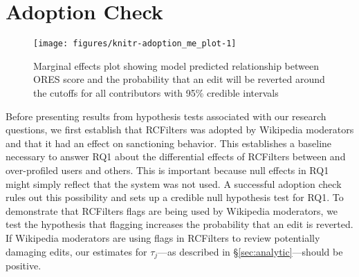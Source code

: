 \documentclass[format=acmsmall, natbib=true,  screen=true]{acmart}
\newenvironment{knitrout}{}{} %
\begin{document}
\section{Adoption Check}
\label{sec:adoption}

\begin{figure}[t]
  \centering
\begin{knitrout}
\color{fgcolor}
\texttt{[image: figures/knitr-adoption\_me\_plot-1]} 

\end{knitrout}
\caption{Marginal effects plot showing model predicted relationship between ORES score and the probability that an edit will be reverted around the cutoffs for all contributors with 95\% credible intervals}
\label{fig:adoption.me}
\end{figure}

Before presenting results from hypothesis tests associated with our research questions, we first establish that RCFilters was adopted by Wikipedia moderators and that it had an effect on sanctioning behavior. This establishes a baseline necessary to answer RQ1 about the differential effects of RCFilters between and over-profiled users and others. This is important because null effects in RQ1 might simply reflect that the system was not used. A successful adoption check rules out this possibility and sets up a credible null hypothesis test for RQ1.
To demonstrate that RCFilters flags are being used by Wikipedia moderators,
we test the hypothesis that flagging increases the probability that an edit is reverted.  If Wikipedia moderators are using flags in RCFilters to review potentially damaging edits, our estimates for $\tau_j$---as described in §\ref{sec:analytic}---should be positive.
\end{document}
